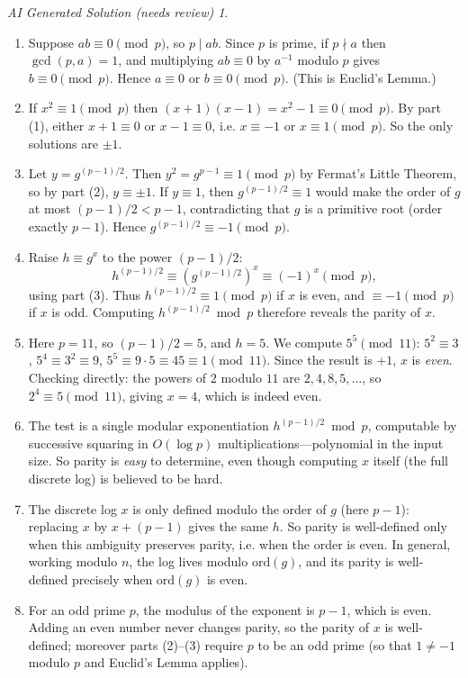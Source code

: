 \documentclass{article}
\theoremstyle{plain}
\theoremstyle{definition}
\theoremstyle{remark}
\newtheorem*{aisolution}{AI Generated Solution (needs review)}
\numberwithin{theorem}{section}
\begin{document}
\begin{aisolution}
\begin{enumerate}
\item Suppose $ab \equiv 0 \pmod p$, so $p \mid ab$.  Since $p$ is prime, if $p \nmid a$ then $\gcd(p,a) = 1$, and multiplying $ab \equiv 0$ by $a^{-1}$ modulo $p$ gives $b \equiv 0 \pmod p$.  Hence $a \equiv 0$ or $b \equiv 0 \pmod p$.  (This is Euclid's Lemma.)
\item If $x^2 \equiv 1 \pmod p$ then $(x+1)(x-1) = x^2 - 1 \equiv 0 \pmod p$.  By part (1), either $x+1 \equiv 0$ or $x-1 \equiv 0$, i.e. $x \equiv -1$ or $x \equiv 1 \pmod p$.  So the only solutions are $\pm 1$.
\item Let $y = g^{(p-1)/2}$.  Then $y^2 = g^{p-1} \equiv 1 \pmod p$ by Fermat's Little Theorem, so by part (2), $y \equiv \pm 1$.  If $y \equiv 1$, then $g^{(p-1)/2} \equiv 1$ would make the order of $g$ at most $(p-1)/2 < p-1$, contradicting that $g$ is a primitive root (order exactly $p-1$).  Hence $g^{(p-1)/2} \equiv -1 \pmod p$.
\item Raise $h \equiv g^x$ to the power $(p-1)/2$:
\[
h^{(p-1)/2} \equiv \left( g^{(p-1)/2} \right)^x \equiv (-1)^x \pmod p,
\]
using part (3).  Thus $h^{(p-1)/2} \equiv 1 \pmod p$ if $x$ is even, and $\equiv -1 \pmod p$ if $x$ is odd.  Computing $h^{(p-1)/2} \bmod p$ therefore reveals the parity of $x$.
\item Here $p = 11$, so $(p-1)/2 = 5$, and $h = 5$.  We compute $5^5 \pmod{11}$: $5^2 \equiv 3$, $5^4 \equiv 3^2 \equiv 9$, $5^5 \equiv 9\cdot 5 \equiv 45 \equiv 1 \pmod{11}$.  Since the result is $+1$, $x$ is \emph{even}.  Checking directly: the powers of $2$ modulo $11$ are $2,4,8,5,\ldots$, so $2^4 \equiv 5 \pmod{11}$, giving $x = 4$, which is indeed even.
\item The test is a single modular exponentiation $h^{(p-1)/2} \bmod p$, computable by successive squaring in $O(\log p)$ multiplications---polynomial in the input size.  So parity is \emph{easy} to determine, even though computing $x$ itself (the full discrete log) is believed to be hard.
\item The discrete log $x$ is only defined modulo the order of $g$ (here $p-1$): replacing $x$ by $x + (p-1)$ gives the same $h$.  So parity is well-defined only when this ambiguity preserves parity, i.e. when the order is even.  In general, working modulo $n$, the log lives modulo $\mathrm{ord}(g)$, and its parity is well-defined precisely when $\mathrm{ord}(g)$ is even.
\item For an odd prime $p$, the modulus of the exponent is $p-1$, which is even.  Adding an even number never changes parity, so the parity of $x$ is well-defined; moreover parts (2)--(3) require $p$ to be an odd prime (so that $1 \neq -1$ modulo $p$ and Euclid's Lemma applies).
\end{enumerate}
\end{aisolution}
\end{document}
